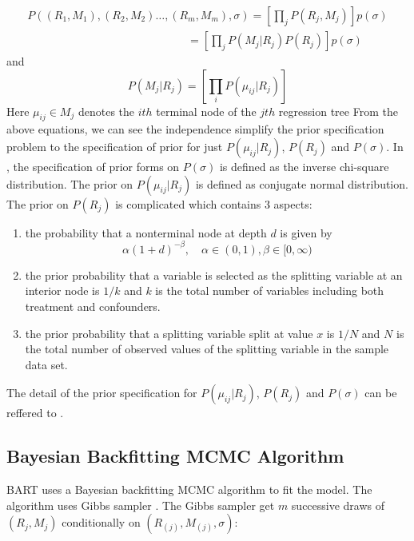 \begin{equation*}
 \begin{array}{l}
P(({R_1},{M_1}),({R_2},{M_2}) \ldots ,({R_m},{M_m}),\sigma ) = \left[ {\prod\limits_j {P({R_j},{M_j})} } \right]p(\sigma )\\
\quad \quad \quad \quad \quad \quad \quad \quad \quad \quad \quad \quad \quad \quad \; = \left[ {\prod\limits_j {P({M_j}|{R_j})P({R_j})} } \right]p(\sigma )
\end{array} 
 \end{equation*}
and
\begin{equation*}
P({M_j}|{R_j}) = \left[ {\prod\limits_i {P({\mu _{ij}}|{R_j})} } \right]
 \end{equation*}
Here ${\mu _{ij}} \in {M_j}$ denotes the $ith$ terminal node of the $jth$ regression tree From the above equations, we can see the independence simplify the prior specification problem to the specification of prior for just ${P({\mu _{ij}}|{R_j})}$, $P({R_j})$ and $P(\sigma)$. In \cite{}, the specification of prior forms on $P(\sigma)$ is defined as the inverse chi-square distribution. The prior on ${P({\mu _{ij}}|{R_j})}$ is defined as conjugate normal distribution. The prior on $P(R_j)$ is complicated which contains 3 aspects: 
\begin{enumerate}
\item the probability that a nonterminal node at depth $d$ is given by 
\begin{equation*}
\alpha {(1 + d)^{ - \beta }},\quad \alpha  \in (0,1),\beta  \in [0,\infty )
 \end{equation*}
\item the prior probability that a variable is selected as the splitting variable at an interior node is $1/k$ and $k$ is the total number of variables including both treatment and confounders. 
\item the prior probability that a splitting variable split at value $x$ is $1/N$ and $N$ is the total number of observed values of the splitting variable in the sample data set.
\end{enumerate}
The detail of the prior specification for ${P({\mu _{ij}}|{R_j})}$, $P({R_j})$ and $P(\sigma)$ can be reffered to \cite{}.


\subsection{Bayesian Backfitting MCMC Algorithm}
BART uses a Bayesian backfitting  MCMC algorithm to fit the model. The algorithm uses Gibbs sampler \cite{}. The Gibbs sampler get $m$ successive draws of $(R_j, M_j)$ conditionally on $(R_{(j)}, M_{(j)}, \sigma)$:

